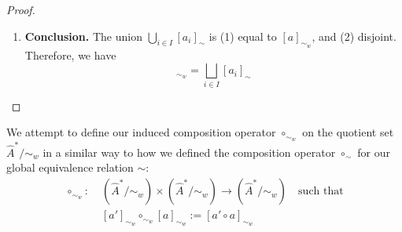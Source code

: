 \begin{proof}
\begin{enumerate}[(1)]
\begin{enumerate}
        \item \textbf{Proof by contradiction.}
        Assume that $[a_{i}]_{\sim}$ and $[a_{j}]_{\sim}$ are distinct global equivalence classes with a common element $b \in \hat{A}^{*}$ such that $b \in [a_{i}]_{\sim} \cap [a_{j}]_{\sim}$.
        By definition of equivalence classes, we have
        \begin{align}
            & b \in [a_{i}]_{\sim} \implies b \sim a_{i} \\
            & b \in [a_{j}]_{\sim} \implies b \sim a_{j}
        \end{align}
        By transitivity of $\sim$, we have
        \begin{align}
            & a_{i} \sim b \sim a_{j} \\
            \implies & a_{i} \sim a_{j} \\
            \implies & [a_{i}]_{\sim} = [a_{j}]_{\sim}
        \end{align}
        This contradicts that $[a_{i}]_{\sim}$ and $[a_{j}]_{\sim}$ are distinct.
    \end{enumerate}

    \item \textbf{Conclusion.}
    The union $\bigcup_{i \in I}[a_{i}]_{\sim}$ is (1) equal to $[a]_{\sim_{w}}$, and (2) disjoint.
    Therefore, we have
    \begin{equation}
        [a]_{\sim_{w}} = \bigsqcup_{i \in I}[a_{i}]_{\sim}
    \end{equation}
\end{enumerate}
\end{proof}






We attempt to define our induced composition operator $\circ_{\sim_{w}}$ on the quotient set $\hat{A}^{*}/\sim_{w}$ in a similar way to how we defined the composition operator $\circ_{\sim}$ for our global equivalence relation $\sim$:
\begin{equation}
\begin{aligned}
    \circ_{\sim_{w}}: \; &(\hat{A}^{*}/\sim_{w}) \times (\hat{A}^{*}/\sim_{w}) \to (\hat{A}^{*}/\sim_{w}) \quad \text{such that}\\
    & [a']_{\sim_{w}} \circ_{\sim_{w}} [a]_{\sim_{w}} := [a' \circ a]_{\sim_{w}}
\end{aligned}
\end{equation}


